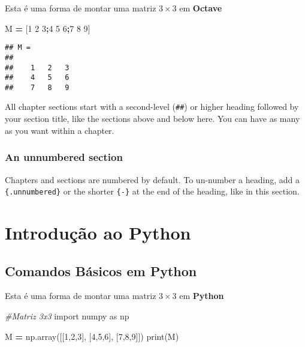 \documentclass[
]{book}
\newenvironment{Shaded}{\begin{snugshade}}{\end{snugshade}}
\newcommand{\BuiltInTok}[1]{#1}
\newcommand{\CommentTok}[1]{\textcolor[rgb]{0.56,0.35,0.01}{\textit{#1}}}
\newcommand{\DecValTok}[1]{\textcolor[rgb]{0.00,0.00,0.81}{#1}}
\newcommand{\FloatTok}[1]{\textcolor[rgb]{0.00,0.00,0.81}{#1}}
\newcommand{\ImportTok}[1]{#1}
\newcommand{\NormalTok}[1]{#1}
\newcommand{\OperatorTok}[1]{\textcolor[rgb]{0.81,0.36,0.00}{\textbf{#1}}}
\begin{document}
Esta é uma forma de montar uma matriz \(3 \times 3\) em \textbf{Octave}

\begin{Shaded}
\begin{Highlighting}[]
\NormalTok{M }\OperatorTok{=}\NormalTok{ [}\FloatTok{1} \FloatTok{2} \FloatTok{3}\OperatorTok{;}\FloatTok{4} \FloatTok{5} \FloatTok{6}\OperatorTok{;}\FloatTok{7} \FloatTok{8} \FloatTok{9}\NormalTok{]}
\end{Highlighting}
\end{Shaded}

\begin{verbatim}
## M =
## 
##    1   2   3
##    4   5   6
##    7   8   9
\end{verbatim}

All chapter sections start with a second-level (\texttt{\#\#}) or higher heading followed by your section title, like the sections above and below here. You can have as many as you want within a chapter.

\hypertarget{an-unnumbered-section}{%
\subsection*{An unnumbered section}\label{an-unnumbered-section}}

Chapters and sections are numbered by default. To un-number a heading, add a \texttt{\{.unnumbered\}} or the shorter \texttt{\{-\}} at the end of the heading, like in this section.

\hypertarget{cross}{%
\chapter{Introdução ao Python}\label{cross}}

\hypertarget{comandos-buxe1sicos-em-python}{%
\section{Comandos Básicos em Python}\label{comandos-buxe1sicos-em-python}}

Esta é uma forma de montar uma matriz \(3 \times 3\) em \textbf{Python}

\begin{Shaded}
\begin{Highlighting}[]
\CommentTok{\#Matriz 3x3}
\ImportTok{import}\NormalTok{ numpy }\ImportTok{as}\NormalTok{ np}

\NormalTok{M }\OperatorTok{=}\NormalTok{ np.array([[}\DecValTok{1}\NormalTok{,}\DecValTok{2}\NormalTok{,}\DecValTok{3}\NormalTok{],}
\NormalTok{              [}\DecValTok{4}\NormalTok{,}\DecValTok{5}\NormalTok{,}\DecValTok{6}\NormalTok{],}
\NormalTok{              [}\DecValTok{7}\NormalTok{,}\DecValTok{8}\NormalTok{,}\DecValTok{9}\NormalTok{]])}
\BuiltInTok{print}\NormalTok{(M)}
\end{Highlighting}
\end{Shaded}
\end{document}
